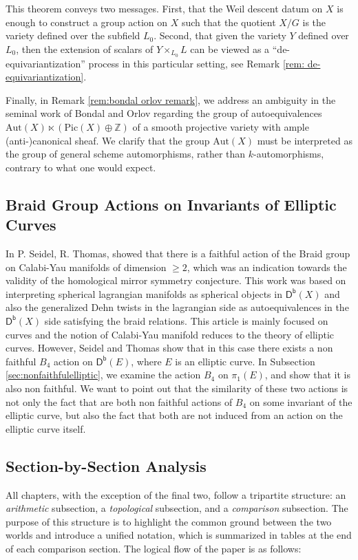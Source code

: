 \documentclass[10pt]{amsart}
\theoremstyle{definition}
\begin{document}
This theorem conveys two messages. First, that the Weil descent datum on $X$ is enough to construct a group action on $X$ such that the quotient $X/G$ is the variety defined over the subfield $L_0$. Second, that given the variety $Y$ defined over $L_0$, then the extension of scalars of $Y \times_{L_0} L $ can be viewed as a ``de-equivariantization'' process in this particular setting, see Remark \ref{rem: de-equivariantization}. 

Finally, in Remark \ref{rem:bondal orlov remark}, we address an ambiguity in the seminal work of Bondal and Orlov \cite{MR1818984} regarding the group of autoequivalences $\mathrm{Aut}(X) \ltimes (\mathrm{Pic}(X) \oplus \mathbb{Z})$ of a smooth projective variety with ample (anti-)canonical sheaf. We clarify that the group $\mathrm{Aut}(X)$ must be interpreted as the group of general scheme automorphisms, rather than $k$-automorphisms, contrary to what one would expect.




\subsection*{Braid Group Actions on Invariants of Elliptic Curves}
In \cite{MR1831820} P. Seidel, R. Thomas, showed that there is a faithful action of the Braid group on Calabi-Yau manifolds of dimension $\geq 2$, which was an indication towards the validity of the homological mirror symmetry conjecture. This work was based on interpreting spherical lagrangian manifolds as spherical objects in $\mathsf{D^b}(X)$ and also the generalized Dehn twists in the lagrangian side as autoequivalences in the $\mathsf{D^b}(X)$ side satisfying the braid relations. This article is mainly focused on curves and the notion of Calabi-Yau manifold reduces to the theory of elliptic curves. However, Seidel and Thomas show that in this case there exists a non faithful $B_4$ action on $\mathsf{D^b}(E)$, where $E$ is an elliptic curve. In Subsection \ref{sec:nonfaithfulelliptic}, we examine the action $B_4$ on $\pi_1(E)$, and show that it is also non faithful. We want to point out that the similarity of these two actions is not only the fact that are both non faithful actions of $B_4$ on some invariant of the elliptic curve, but also the fact that both are not induced from an action on the elliptic curve itself.



\subsection*{Section-by-Section Analysis}
All chapters, with the exception of the final two, follow a tripartite structure: an \textit{arithmetic} subsection, a \textit{topological} subsection, and a \textit{comparison} subsection. The purpose of this structure is to highlight the common ground between the two worlds and introduce a unified notation, which is summarized in tables at the end of each comparison section. The logical flow of the paper is as follows:
\end{document}
